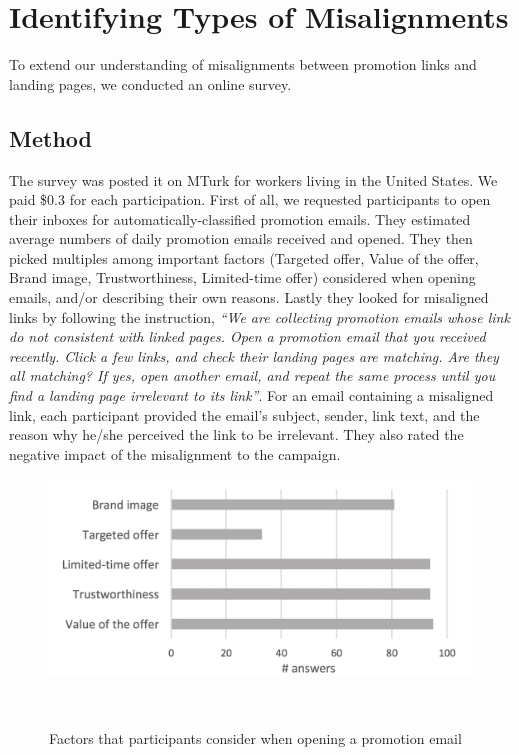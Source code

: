 \documentclass{sigchi}
\begin{document}

\section{Identifying Types of Misalignments}
To extend our understanding of misalignments between promotion links and landing pages, we conducted an online survey. 

\subsection{Method}
The survey was posted it on MTurk for workers living in the United States. We paid \$0.3 for each participation. First of all, we requested participants to open their inboxes for automatically-classified promotion emails. They estimated average numbers of daily promotion emails received and opened. They then picked multiples among important factors (Targeted offer, Value of the offer, Brand image, Trustworthiness, Limited-time offer) considered when opening emails, and/or describing their own reasons. Lastly they looked for misaligned links by following the instruction, \textit{``We are collecting promotion emails whose link do not consistent with linked pages. Open a promotion email that you received recently. Click a few links, and check their landing pages are matching. Are they all matching? If yes, open another email, and repeat the same process until you find a landing page irrelevant to its link''}. For an email containing a misaligned link, each participant provided the email's subject, sender, link text, and the reason why he/she perceived the link to be irrelevant. They also rated the negative impact of the misalignment to the campaign.


\begin{figure}
\centering
  \includegraphics[width=0.85\columnwidth]{figures/open-email-factors}
  \caption{Factors that participants consider when opening a promotion email}~\label{fig:open-email-factors}
\end{figure}
\end{document}

